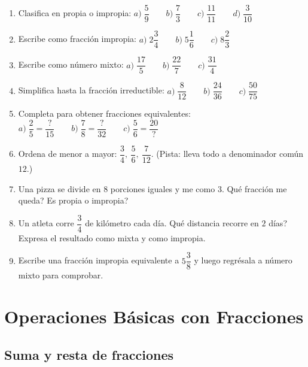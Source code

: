 \documentclass[12pt, letterpaper]{article}
\begin{document}
\begin{enumerate}[leftmargin=*]
  \item \facil{} Clasifica en propia o impropia: $a)\; \dfrac{5}{9} \qquad b)\; \dfrac{7}{3} \qquad c)\; \dfrac{11}{11} \qquad d)\; \dfrac{3}{10}$

  \item \facil{} Escribe como fracción impropia: $a)\; 2\dfrac{3}{4} \qquad b)\; 5\dfrac{1}{6} \qquad c)\; 8\dfrac{2}{3}$

  \item \facil{} Escribe como número mixto: $a)\; \dfrac{17}{5} \qquad b)\; \dfrac{22}{7} \qquad c)\; \dfrac{31}{4}$

  \item \facil{} Simplifica hasta la fracción irreductible: $a)\; \dfrac{8}{12} \qquad b)\; \dfrac{24}{36} \qquad c)\; \dfrac{50}{75}$

  \item \facil{} Completa para obtener fracciones equivalentes: $a)\; \dfrac{2}{5} = \dfrac{?}{15} \qquad b)\; \dfrac{7}{8} = \dfrac{?}{32} \qquad c)\; \dfrac{5}{6} = \dfrac{20}{?}$

  \item \medio{} Ordena de menor a mayor: $\dfrac{3}{4},\ \dfrac{5}{6},\ \dfrac{7}{12}$. (Pista: lleva todo a denominador común $12$.)

  \item \medio{} Una pizza se divide en $8$ porciones iguales y me como $3$. \textquestiondown Qué fracción me queda? \textquestiondown Es propia o impropia?

  \item \dificil{} Un atleta corre $\dfrac{3}{4}$ de kilómetro cada día. \textquestiondown Qué distancia recorre en $2$ días? Expresa el resultado como mixta y como impropia.

  \item \dificil{} Escribe una fracción impropia equivalente a $5\dfrac{3}{8}$ y luego regrésala a número mixto para comprobar.
\end{enumerate}

\newpage

\section{Operaciones Básicas con Fracciones}

\subsection{Suma y resta de fracciones}
\end{document}
